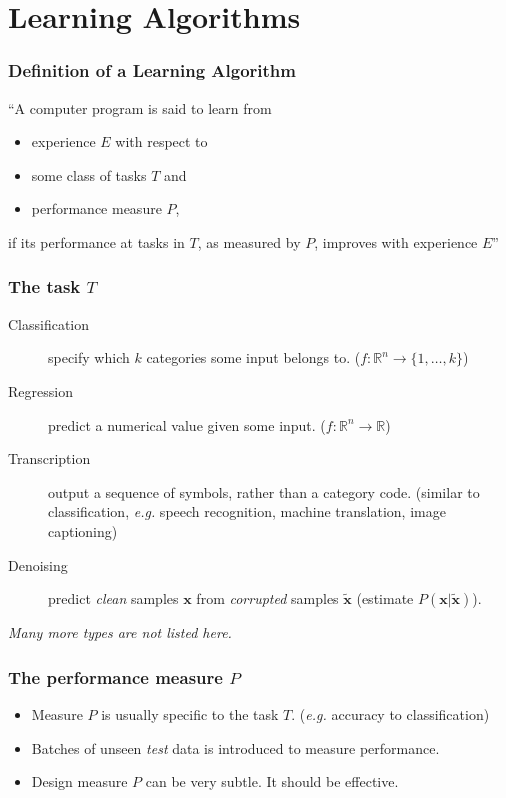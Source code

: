 \documentclass{beamer}
\begin{document}
\section{Learning Algorithms}

\begin{frame}
  \frametitle{Definition of a Learning Algorithm}

  ``A computer program is said to learn from
  \begin{itemize}
    \item[\checkmark] experience $E$ with respect to
    \item[\checkmark] some class of tasks $T$ and
    \item[\checkmark] performance measure $P$,
  \end{itemize}
  if its performance at tasks in $T$, as measured by $P$, improves with experience $E$'' \cite{mitchelltm1997}

\end{frame}

\begin{frame}
  \frametitle{The task $T$}

  \begin{description}
    \item[Classification] specify which $k$ categories some input belongs to. ($f: \mathbb{R}^{n}\rightarrow \{1,\ldots,k\}$)
    \item[Regression] predict a numerical value given some input. ($f: \mathbb{R}^{n}\rightarrow\mathbb{R}$)
    \item[Transcription] output a sequence of symbols, rather than a category code. (similar to classification, \emph{e.g.} speech recognition, machine translation, image captioning)
    \item[Denoising] predict \emph{clean} samples $\bm{x}$ from \emph{corrupted} samples $\tilde{\mathbf{x}}$ (estimate $P(\mathbf{x}|\tilde{\mathbf{x}})$).
  \end{description}

\small
\emph{Many more types are not listed here.}
\end{frame}

\begin{frame}
  \frametitle{The performance measure $P$}

  \begin{itemize}
    \item[\ding{226}] Measure $P$ is usually specific to the task $T$. (\emph{e.g.} accuracy to classification)
    \item[\ding{226}] Batches of unseen \emph{test} data is introduced to measure performance.
    \item[\ding{226}] Design measure $P$ can be very subtle. It should be effective.
  \end{itemize}
\end{frame}
\end{document}
